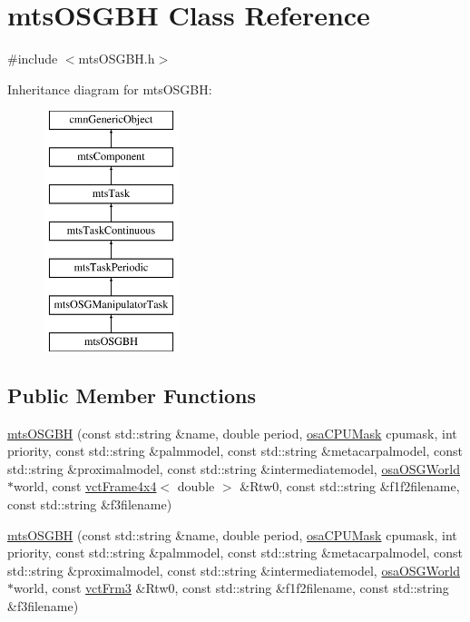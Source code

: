 \hypertarget{classmts_o_s_g_b_h}{}\section{mts\+O\+S\+G\+B\+H Class Reference}
\label{classmts_o_s_g_b_h}


{\ttfamily \#include $<$mts\+O\+S\+G\+B\+H.\+h$>$}

Inheritance diagram for mts\+O\+S\+G\+B\+H\+:\begin{figure}[H]
\begin{center}
\leavevmode
\includegraphics[height=7.000000cm]{d4/d8a/classmts_o_s_g_b_h}
\end{center}
\end{figure}
\subsection*{Public Member Functions}
\begin{DoxyCompactItemize}
\item 
\hyperlink{classmts_o_s_g_b_h_addf83e60d69c2adbf3ddbedd12a1fcf9}{mts\+O\+S\+G\+B\+H} (const std\+::string \&name, double period, \hyperlink{osa_c_p_u_affinity_8h_aaec7cdd7797e5e6eb5438c15fee5477a}{osa\+C\+P\+U\+Mask} cpumask, int priority, const std\+::string \&palmmodel, const std\+::string \&metacarpalmodel, const std\+::string \&proximalmodel, const std\+::string \&intermediatemodel, \hyperlink{classosa_o_s_g_world}{osa\+O\+S\+G\+World} $\ast$world, const \hyperlink{classvct_frame4x4}{vct\+Frame4x4}$<$ double $>$ \&Rtw0, const std\+::string \&f1f2filename, const std\+::string \&f3filename)
\item 
\hyperlink{classmts_o_s_g_b_h_a617315a3039576e70ee46481d94a37a1}{mts\+O\+S\+G\+B\+H} (const std\+::string \&name, double period, \hyperlink{osa_c_p_u_affinity_8h_aaec7cdd7797e5e6eb5438c15fee5477a}{osa\+C\+P\+U\+Mask} cpumask, int priority, const std\+::string \&palmmodel, const std\+::string \&metacarpalmodel, const std\+::string \&proximalmodel, const std\+::string \&intermediatemodel, \hyperlink{classosa_o_s_g_world}{osa\+O\+S\+G\+World} $\ast$world, const \hyperlink{vct_transformation_types_8h_a81feda0a02c2d1bc26e5553f409fed20}{vct\+Frm3} \&Rtw0, const std\+::string \&f1f2filename, const std\+::string \&f3filename)
\end{DoxyCompactItemize}
